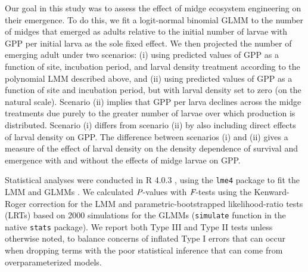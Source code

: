 Our goal in this study was to assess the effect of midge ecosystem engineering 
on their emergence.  
To do this, we fit a logit-normal binomial GLMM 
to the number of midges that emerged as adults
relative to the initial number of larvae 
with GPP per initial larva as the sole fixed effect. 
We then projected the number of emerging adult under two scenarios: 
(i) using predicted values of GPP as a function of site, incubation period, 
and larval density treatment according to the polynomial LMM described above, 
and (ii) using predicted values of GPP as a function of site and incubation period, 
but with larval density set to zero (on the natural scale). 
Scenario (ii) implies that GPP per larva declines across the midge treatments 
due purely to the greater number of larvae over which production is distributed. 
Scenario (i) differs from scenario (ii) by also including direct effects of 
larval density on GPP. 
The difference between scenarios (i) and (ii) gives a measure of the effect 
of larval density on the density dependence of survival and emergence 
with and without the effects of midge larvae on GPP.

Statistical analyses were conducted in R 4.0.3 \citep{r2020},
using the \texttt{lme4} package to fit the LMM and GLMMs \citep{lme4}.
We calculated $\emph{P}$-values with $\emph{F}$-tests using
the Kenward-Roger correction for the LMM
and parametric-bootstrapped likelihood-ratio tests (LRTs) based on 2000 simulations
for the GLMMs (\texttt{simulate} function in the native \texttt{stats} package).
We report both Type III and Type II tests unless otherwise noted,
to balance concerns of inflated Type I errors that can occur when dropping 
terms with the poor statistical inference that can come from overparameterized models.









